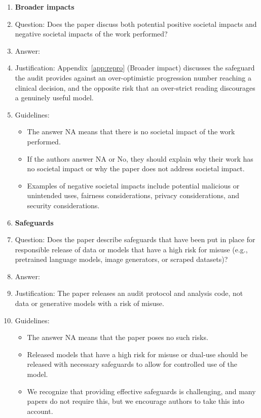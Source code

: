 \begin{enumerate}
\item {\bf Broader impacts}
    \item[] Question: Does the paper discuss both potential positive societal impacts and negative societal impacts of the work performed?
    \item[] Answer: \answerYes{}
    \item[] Justification: Appendix~\ref{app:repro} (Broader impact) discusses the safeguard the audit provides against an over-optimistic progression number reaching a clinical decision, and the opposite risk that an over-strict reading discourages a genuinely useful model.
    \item[] Guidelines:
    \begin{itemize}
        \item The answer NA means that there is no societal impact of the work performed.
        \item If the authors answer NA or No, they should explain why their work has no societal impact or why the paper does not address societal impact.
        \item Examples of negative societal impacts include potential malicious or unintended uses, fairness considerations, privacy considerations, and security considerations.
    \end{itemize}

\item {\bf Safeguards}
    \item[] Question: Does the paper describe safeguards that have been put in place for responsible release of data or models that have a high risk for misuse (e.g., pretrained language models, image generators, or scraped datasets)?
    \item[] Answer: \answerNA{}
    \item[] Justification: The paper releases an audit protocol and analysis code, not data or generative models with a risk of misuse.
    \item[] Guidelines:
    \begin{itemize}
        \item The answer NA means that the paper poses no such risks.
        \item Released models that have a high risk for misuse or dual-use should be released with necessary safeguards to allow for controlled use of the model.
        \item We recognize that providing effective safeguards is challenging, and many papers do not require this, but we encourage authors to take this into account.
    \end{itemize}


\end{enumerate}

